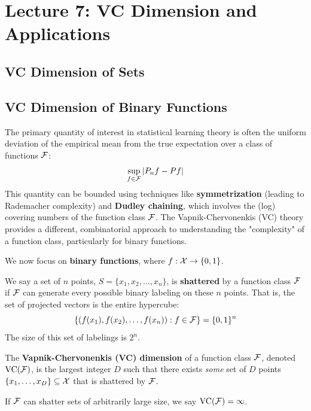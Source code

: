 \section{Lecture 7: VC Dimension and Applications}
\subsection{VC Dimension of Sets}


\subsection{VC Dimension of Binary Functions}
The primary quantity of interest in statistical learning theory is often the uniform deviation of the empirical mean from the true expectation over a class of functions $\mathcal{F}$:
$$
\sup_{f \in \mathcal{F}} \left| P_n f-Pf \right|
$$
This quantity can be bounded using techniques like \textbf{symmetrization} (leading to Rademacher complexity) and \textbf{Dudley chaining}, which involves the (log) covering numbers of the function class $\mathcal{F}$. The Vapnik-Chervonenkis (VC) theory provides a different, combinatorial approach to understanding the "complexity" of a function class, particularly for binary functions.

We now focus on \textbf{binary functions}, where $f: \mathcal{X} \to \{0, 1\}$.

\begin{de}[Shattering]
We say a set of $n$ points, $S = \{x_1, x_2, \dots, x_n\}$, is \textbf{shattered} by a function class $\mathcal{F}$ if $\mathcal{F}$ can generate every possible binary labeling on these $n$ points.
That is, the set of projected vectors is the entire hypercube:
$$
\left\{ (f(x_1), f(x_2), \dots, f(x_n)) : f \in \mathcal{F} \right\} = \{0, 1\}^n
$$
The size of this set of labelings is $2^n$.
\end{de}

\begin{de}[VC Dimension]
The \textbf{Vapnik-Chervonenkis (VC) dimension} of a function class $\mathcal{F}$, denoted $\text{VC}(\mathcal{F})$, is the largest integer $D$ such that there exists \emph{some} set of $D$ points $\{x_1, \dots, x_D\} \subseteq \mathcal{X}$ that is shattered by $\mathcal{F}$.

If $\mathcal{F}$ can shatter sets of arbitrarily large size, we say $\text{VC}(\mathcal{F}) = \infty$.
\end{de}

